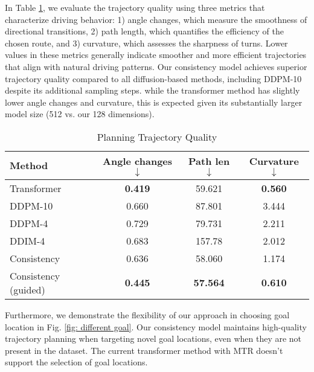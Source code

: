In Table \ref{tab:trajectory quality}, we evaluate the trajectory quality using three metrics that characterize driving behavior: 1) angle changes, which measure the smoothness of directional transitions, 2) path length, which quantifies the efficiency of the chosen route, and 3) curvature, which assesses the sharpness of turns. 
Lower values in these metrics generally indicate smoother and more efficient trajectories that align with natural driving patterns.
Our consistency model achieves superior trajectory quality compared to all diffusion-based methods, including DDPM-10 despite its additional sampling steps.
while the transformer method has slightly lower angle changes and curvature, this is expected given its substantially larger model size (512 vs. our 128 dimensions).

\begin{table}[t]
    \centering
    \caption{Planning Trajectory Quality}
    \label{tab:trajectory quality}
    \begin{tabular}{lccc}
    \toprule
    Method & Angle changes $\downarrow$ & Path len $\downarrow$ & Curvature $\downarrow$ \\
    \midrule
    Transformer & \textbf{0.419} & 59.621 & \textbf{0.560} \\
    \midrule
    DDPM-10  & 0.660 & 87.801 & 3.444 \\
    DDPM-4 & 0.729 & 79.731 & 2.211 \\
    DDIM-4 & 0.683 & 157.78 & 2.012 \\
    Consistency & 0.636 & 58.060 & 1.174 \\
    Consistency (guided) & \textbf{0.445} & \textbf{57.564} & \textbf{0.610} \\
    \bottomrule
    \end{tabular}
\end{table}


Furthermore, we demonstrate the flexibility of our approach in choosing goal location in Fig. \ref{fig: different goal}.
Our consistency model maintains high-quality trajectory planning when targeting novel goal locations, even when they are not present in the dataset.
The current transformer method with MTR doesn't support the selection of goal locations.


